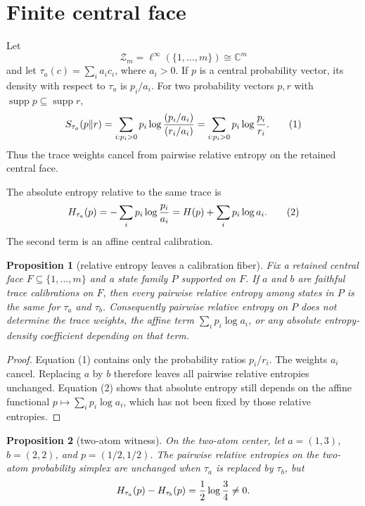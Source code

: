 \documentclass[12pt]{article}
\newtheorem{proposition}{Proposition}
\theoremstyle{remark}
\newcommand{\C}{\mathbb C}
\newcommand{\Z}{\mathcal Z}
\newcommand{\supp}{\operatorname{supp}}
\begin{document}
\section{Finite central face}

Let
\[
  \Z_m=\ell^\infty(\{1,\ldots,m\})\cong\C^m
\]
and let \(\tau_a(c)=\sum_i a_i c_i\), where \(a_i>0\).  If \(p\) is a central
probability vector, its density with respect to \(\tau_a\) is \(p_i/a_i\).
For two probability vectors \(p,r\) with \(\supp p\subseteq\supp r\),
\[
  S_{\tau_a}(p\Vert r)
  =
  \sum_{i:p_i>0}p_i
  \log{(p_i/a_i)\over(r_i/a_i)}
  =
  \sum_{i:p_i>0}p_i\log{p_i\over r_i}.
  \tag{1}
\]
Thus the trace weights cancel from pairwise relative entropy on the retained
central face.

The absolute entropy relative to the same trace is
\[
  H_{\tau_a}(p)
  =
  -\sum_i p_i\log{p_i\over a_i}
  =
  H(p)+\sum_i p_i\log a_i .
  \tag{2}
\]
The second term is an affine central calibration.

\begin{proposition}[relative entropy leaves a calibration fiber]
\label{prop:calibration-fiber}
Fix a retained central face \(F\subseteq\{1,\ldots,m\}\) and a state family
\(P\) supported on \(F\).  If \(a\) and \(b\) are faithful trace calibrations
on \(F\), then every pairwise relative entropy among states in \(P\) is the
same for \(\tau_a\) and \(\tau_b\).  Consequently pairwise relative entropy on
\(P\) does not determine the trace weights, the affine term
\(\sum_i p_i\log a_i\), or any absolute entropy-density coefficient depending
on that term.
\end{proposition}

\begin{proof}
Equation (1) contains only the probability ratios \(p_i/r_i\).  The weights
\(a_i\) cancel.  Replacing \(a\) by \(b\) therefore leaves all pairwise
relative entropies unchanged.  Equation (2) shows that absolute entropy still
depends on the affine functional \(p\mapsto\sum_i p_i\log a_i\), which has not
been fixed by those relative entropies.
\end{proof}

\begin{proposition}[two-atom witness]
\label{prop:two-atom-witness}
On the two-atom center, let \(a=(1,3)\), \(b=(2,2)\), and
\(p=(1/2,1/2)\).  The pairwise relative entropies on the two-atom probability
simplex are unchanged when \(\tau_a\) is replaced by \(\tau_b\), but
\[
  H_{\tau_a}(p)-H_{\tau_b}(p)=\frac12\log{3\over4}\ne0 .
\]
\end{proposition}
\end{document}
